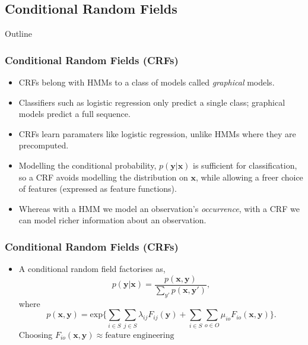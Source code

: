 \documentclass{beamer}
\begin{document}

\subsection{Conditional Random Fields}


\begin{frame}[noframenumbering]{Outline}
\tableofcontents[currentsubsection]
\end{frame}


\begin{frame}
\frametitle{Conditional Random Fields (CRFs)}
\begin{itemize}
\item CRFs belong with HMMs to a class of models called \emph{graphical} models.
\item Classifiers such as logistic regression only predict a single class; graphical models predict a full sequence.
\item CRFs learn paramaters like logistic regression, unlike HMMs where they are precomputed.
\item Modelling the conditional probability, $p(\textbf{y} | \textbf{x})$ is sufficient for classification, so a CRF avoids modelling the distribution on $\textbf{x}$, while allowing a freer choice of features (expressed as feature functions).
\item Whereas with a HMM we model an observation's \emph{occurrence}, with a CRF we can  model richer information about an observation.
\end{itemize}
\end{frame}


\begin{frame}

\frametitle{Conditional Random Fields (CRFs)}
\begin{itemize}
\item A conditional random field factorises as,
$$p(\textbf{y}|\textbf{x}) = \frac{p(\textbf{x}, \textbf{y})}{\sum_{y'}{p(\textbf{x}, \textbf{y}')}},$$ where
$$
p(\textbf{x}, \textbf{y}) = \text{exp} \Bigg\{
\sum_{i \in S}
\sum_{j \in S}
\lambda_{ij}
F_{ij}(\textbf{y})
+ 
\sum_{i \in S}
\sum_{o \in O}
\mu_{io}
F_{io}(\textbf{x}, \textbf{y})
\Bigg\}.
$$
Choosing $F_{io}(\textbf{x}, \textbf{y}) \approx \text{feature engineering}$
\end{itemize}

\end{frame}
\end{document}

